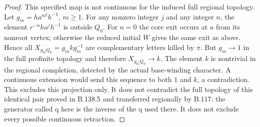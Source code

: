 \begin{proof}
This specified map is not continuous for the induced full regional
topology. Let $g_m=ha^{m!}h^{-1}$, $m\geq1$. For any nonzero
integer $j$ and any integer $n$, the element
$r^{-n}ha^jh^{-1}$ is outside $Q_0$. For $n=0$ the core exit
occurs at $a$ from its nonroot vertex; otherwise the reduced initial
$W$ gives the same exit as above. Hence all
$X_{g_mQ_0}=g_mkg_m^{-1}$ are complementary letters killed by
$\pi$. But $g_m\to1$ in the full profinite topology and therefore
$X_{g_mQ_0}\to k$. The element $k$ is nontrivial in the regional
completion, detected by the actual base-winding character. A
continuous extension would send this sequence to both $1$ and
$k$, a contradiction. This excludes this projection only. It does
not contradict the full topology of this identical pair proved
in B.138.5 and transferred regionally by B.117: the generator called
q here is the inverse of the q used there. It does not exclude every
possible continuous retraction.


\end{proof}
